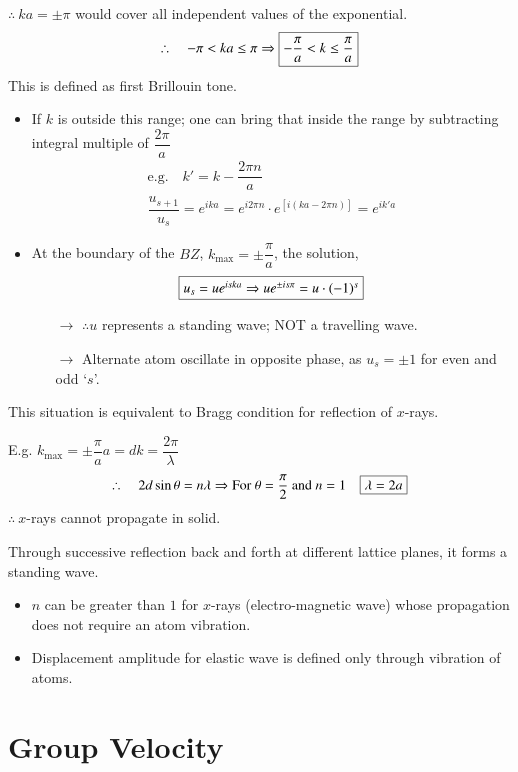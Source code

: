 $\therefore \ ka=\pm \pi$ would cover all independent values of the exponential.
$$
\therefore\quad -\pi <ka\leq \pi \Rightarrow \fbox{$-\dfrac{\pi}{a}<k\leq \dfrac{\pi}{a}$}
$$
This is defined as first Brillouin tone.
\begin{itemize}
\item If $k$ is outside this range; one can bring that inside the range by subtracting integral multiple of $\dfrac{2\pi}{a}$
\begin{gather*}
\text{e.g.}\quad k'=k-\dfrac{2\pi n}{a}\\
\dfrac{u_{s+1}}{u_{s}}=e^{ika}=e^{i2\pi n}\cdot e^{[i(ka-2\pi n)]}=e^{ik'a}
\end{gather*}

\item At the boundary of the $BZ$, $k_{\max}=\pm \dfrac{\pi}{a}$, the solution,
$$
\fbox{$u_{s}=ue^{iska}\Rightarrow ue^{\pm is\pi}=u\cdot (-1)^{s}$}
$$
\begin{itemize}
\item[$\to$] $\therefore u$ represents a standing wave; NOT a travelling wave.

\item[$\to$] Alternate atom oscillate in opposite phase, as $u_{s}=\pm 1$ for even and odd `$s$'.
\end{itemize}
\end{itemize}
This situation is equivalent to Bragg condition for reflection of $x$-rays.

E.g. $k_{\max}=\pm \dfrac{\pi}{a}$\quad $a=d$\quad $k=\dfrac{2\pi}{\lambda}$
$$
\therefore\quad 2d\sin \theta=n\lambda \Rightarrow \text{For } \theta=\dfrac{\pi}{2}\text{ and } n=1\quad \fbox{$\lambda=2a$}
$$
$\therefore \ x$-rays cannot propagate in solid.

Through successive reflection back and forth at different lattice planes, it forms a standing wave.
\begin{itemize}
\item $n$ can be greater than $1$ for $x$-rays (electro-magnetic wave) whose propagation does not require an atom vibration.

\item Displacement amplitude for elastic wave is defined only through vibration of atoms.
\end{itemize}

\section*{Group Velocity}

